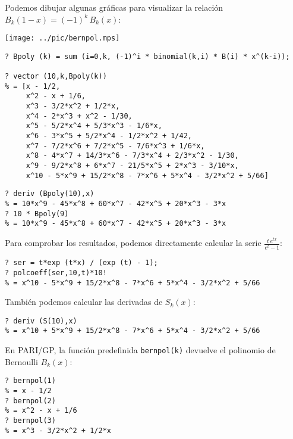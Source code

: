 \documentclass{article}
\begin{document}
\vspace{\fill}

Podemos dibujar algunas gráficas para visualizar la relación $B_k (1-x) = (-1)^k \, B_k (x)$:

\begin{center}
\texttt{[image: ../pic/bernpol.mps]}
\end{center}

\pagebreak

\begin{shaded}
\small

\begin{verbatim}
? Bpoly (k) = sum (i=0,k, (-1)^i * binomial(k,i) * B(i) * x^(k-i));

? vector (10,k,Bpoly(k))  
% = [x - 1/2,
     x^2 - x + 1/6,
     x^3 - 3/2*x^2 + 1/2*x,
     x^4 - 2*x^3 + x^2 - 1/30,
     x^5 - 5/2*x^4 + 5/3*x^3 - 1/6*x,
     x^6 - 3*x^5 + 5/2*x^4 - 1/2*x^2 + 1/42,
     x^7 - 7/2*x^6 + 7/2*x^5 - 7/6*x^3 + 1/6*x,
     x^8 - 4*x^7 + 14/3*x^6 - 7/3*x^4 + 2/3*x^2 - 1/30,
     x^9 - 9/2*x^8 + 6*x^7 - 21/5*x^5 + 2*x^3 - 3/10*x,
     x^10 - 5*x^9 + 15/2*x^8 - 7*x^6 + 5*x^4 - 3/2*x^2 + 5/66]
\end{verbatim}

\begin{verbatim}
? deriv (Bpoly(10),x)
% = 10*x^9 - 45*x^8 + 60*x^7 - 42*x^5 + 20*x^3 - 3*x
? 10 * Bpoly(9)
% = 10*x^9 - 45*x^8 + 60*x^7 - 42*x^5 + 20*x^3 - 3*x
\end{verbatim}

\noindent Para comprobar los resultados, podemos directamente calcular la serie $\frac{t\,e^{tx}}{e^t - 1}$:

\begin{verbatim}
? ser = t*exp (t*x) / (exp (t) - 1);
? polcoeff(ser,10,t)*10!
% = x^10 - 5*x^9 + 15/2*x^8 - 7*x^6 + 5*x^4 - 3/2*x^2 + 5/66
\end{verbatim}

\noindent También podemos calcular las derivadas de $S_k (x)$:

\begin{verbatim}
? deriv (S(10),x)
% = x^10 + 5*x^9 + 15/2*x^8 - 7*x^6 + 5*x^4 - 3/2*x^2 + 5/66
\end{verbatim}

\noindent En PARI/GP, la función predefinida \verb|bernpol(k)| devuelve el polinomio de Bernoulli $B_k (x)$:

\begin{verbatim}
? bernpol(1)
% = x - 1/2
? bernpol(2)
% = x^2 - x + 1/6
? bernpol(3)
% = x^3 - 3/2*x^2 + 1/2*x
\end{verbatim}
\end{shaded}
\end{document}
